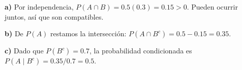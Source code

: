 \textbf{a)} Por independencia,
$P(A\cap B)=0.5(0.3)=0.15>0$. Pueden ocurrir juntos,
así que son compatibles.

\textbf{b)} De $P(A)$ restamos la intersección:
$P(A\cap B^c)=0.5-0.15=\boxed{0.35}$.

\textbf{c)} Dado que $P(B^c)=0.7$, la probabilidad condicionada
es $P(A\mid B^c)=0.35/0.7=\boxed{0.5}$.
